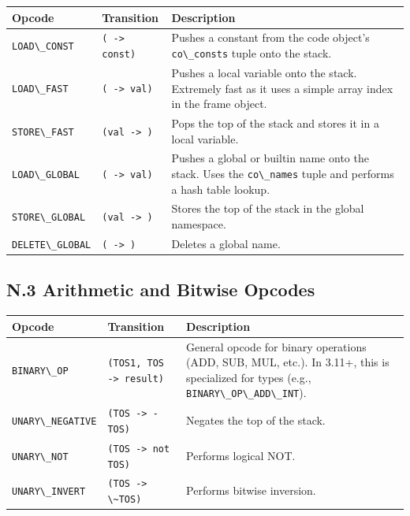 \begin{longtable}[]{@{}
  >{\raggedright\arraybackslash}p{}
  >{\raggedright\arraybackslash}p{}
  >{\raggedright\arraybackslash}p{}@{}}
\toprule
Opcode & Transition & Description \\
\midrule
\endhead
\passthrough{\lstinline!LOAD\_CONST!} &
\passthrough{\lstinline!( -> const)!} & Pushes a constant from the code
object's \passthrough{\lstinline!co\_consts!} tuple onto the stack. \\
\passthrough{\lstinline!LOAD\_FAST!} &
\passthrough{\lstinline!( -> val)!} & Pushes a local variable onto the
stack. Extremely fast as it uses a simple array index in the frame
object. \\
\passthrough{\lstinline!STORE\_FAST!} &
\passthrough{\lstinline!(val -> )!} & Pops the top of the stack and
stores it in a local variable. \\
\passthrough{\lstinline!LOAD\_GLOBAL!} &
\passthrough{\lstinline!( -> val)!} & Pushes a global or builtin name
onto the stack. Uses the \passthrough{\lstinline!co\_names!} tuple and
performs a hash table lookup. \\
\passthrough{\lstinline!STORE\_GLOBAL!} &
\passthrough{\lstinline!(val -> )!} & Stores the top of the stack in the
global namespace. \\
\passthrough{\lstinline!DELETE\_GLOBAL!} &
\passthrough{\lstinline!( -> )!} & Deletes a global name. \\
\bottomrule
\end{longtable}

\hypertarget{n.3-arithmetic-and-bitwise-opcodes}{%
\subsection{N.3 Arithmetic and Bitwise
Opcodes}\label{n.3-arithmetic-and-bitwise-opcodes}}

\begin{longtable}[]{@{}
  >{\raggedright\arraybackslash}p{}
  >{\raggedright\arraybackslash}p{}
  >{\raggedright\arraybackslash}p{}@{}}
\toprule
Opcode & Transition & Description \\
\midrule
\endhead
\passthrough{\lstinline!BINARY\_OP!} &
\passthrough{\lstinline!(TOS1, TOS -> result)!} & General opcode for
binary operations (ADD, SUB, MUL, etc.). In 3.11+, this is specialized
for types (e.g., \passthrough{\lstinline!BINARY\_OP\_ADD\_INT!}). \\
\passthrough{\lstinline!UNARY\_NEGATIVE!} &
\passthrough{\lstinline!(TOS -> -TOS)!} & Negates the top of the
stack. \\
\passthrough{\lstinline!UNARY\_NOT!} &
\passthrough{\lstinline!(TOS -> not TOS)!} & Performs logical NOT. \\
\passthrough{\lstinline!UNARY\_INVERT!} &
\passthrough{\lstinline!(TOS -> \~TOS)!} & Performs bitwise
inversion. \\
\bottomrule
\end{longtable}

